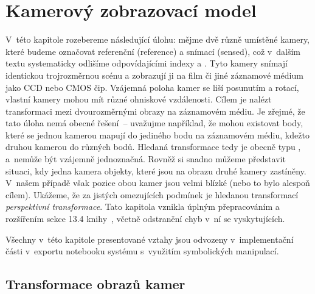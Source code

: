 
\chapter{Kamerový zobrazovací model}\label{CAPczm}%

V~této kapitole rozebereme následující úlohu: mějme dvě různě umístěné kamery,
které budeme označovat referenční (reference) a snímací (sensed), což v~dalším
textu systematicky odlišíme odpovídajícími indexy  a . Tyto kamery
snímají identickou trojrozměrnou scénu a zobrazují ji na film či jiné
záznamové médium jako CCD nebo CMOS čip. Vzájemná poloha kamer se liší
posunutím a rotací, vlastní kamery mohou mít různé ohniskové
vzdálenosti. Cílem je nalézt transformaci mezi dvourozměrnými obrazy na
záznamovém médiu. Je zřejmé, že tato úloha nemá obecné řešení~-- uvažujme
například, že mohou existovat body, které se jednou kamerou mapují do jediného
bodu na záznamovém médiu, kdežto druhou kamerou do různých bodů. Hledaná
transformace tedy je obecně typu , a~nemůže být vzájemně
jednoznačná. Rovněž si snadno můžeme představit situaci, kdy jedna kamera
 objekty, které jsou na obrazu druhé kamery zastíněny. V~našem
případě však pozice obou kamer jsou velmi blízké (nebo to bylo alespoň
cílem). Ukážeme, že za jistých omezujících podmínek je hledanou transformací
\emph{perspektivní transformace}. Tato kapitola vznikla úplným přepracováním a
rozšířením sekce 13.4 knihy~\cite{Pra:2007:DigImageProc:4}, včetně odstranění
chyb v~ní se vyskytujících.

Všechny v~této kapitole presentované vztahy jsou odvozeny v~implementační
části v~exportu notebooku systému \Mma{} s~využitím symbolických manipulací.

\section{Transformace obrazů kamer}\label{SECcamtr}%

